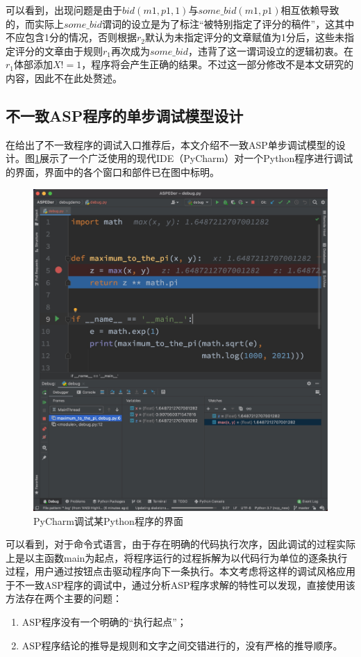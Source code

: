 \begin{example}
可以看到，出现问题是由于$bid(m1, p1, 1)$与$some\_bid(m1, p1)$相互依赖导致的，而实际上$some\_bid$谓词的设立是为了标注“被特别指定了评分的稿件”，这其中不应包含1分的情况，否则根据$r_2$默认为未指定评分的文章赋值为1分后，这些未指定评分的文章由于规则$r_1$再次成为$some\_bid$，违背了这一谓词设立的逻辑初衷。在$r_1$体部添加$X \mathrel{\mathtt{!=}} 1$，程序将会产生正确的结果。不过这一部分修改不是本文研究的内容，因此不在此处赘述。
\end{example}

\subsection{不一致ASP程序的单步调试模型设计}
在给出了不一致程序的调试入口推荐后，本文介绍不一致ASP单步调试模型的设计。图\ref{fig:dbgpycharm}展示了一个广泛使用的现代IDE（PyCharm）对一个Python程序进行调试的界面，界面中的各个窗口和部件已在图中标明。
\begin{figure}[t]
    \centering
    \includegraphics[height=.8\textwidth, valign=c]{figures/现代IDE调试界面.jpg}
    \caption{PyCharm调试某Python程序的界面}
    \label{fig:dbgpycharm}
\end{figure}
可以看到，对于命令式语言，由于存在明确的代码执行次序，因此调试的过程实际上是以主函数main为起点，将程序运行的过程拆解为以代码行为单位的逐条执行过程，用户通过按钮点击驱动程序向下一条执行。本文考虑将这样的调试风格应用于不一致ASP程序的调试中，通过分析ASP程序求解的特性可以发现，直接使用该方法存在两个主要的问题：
\begin{enumerate}[label=(\arabic*), topsep=0pt]
    \setlength\itemsep{-0.3em}
    \item ASP程序没有一个明确的“执行起点”；
    \item ASP程序结论的推导是规则和文字之间交错进行的，没有严格的推导顺序。
\end{enumerate}

